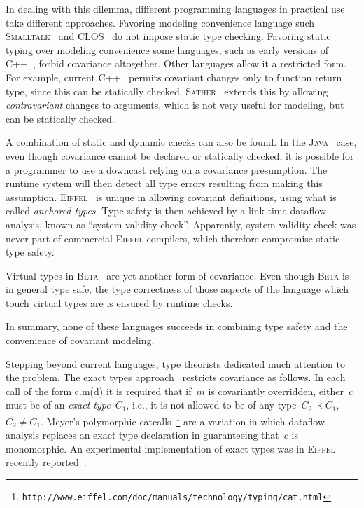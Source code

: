 \documentclass[11pt]{article}
\numberwithin{figure}{section}
\newcommand\CC{\Lang{\mbox{C++}}\xspace}
\newcommand\Lang[1]{\textsc{#1}}
\begin{document}
In dealing with this dilemma, different programming languages in practical
    use take different approaches.
Favoring modeling convenience
    language such \Lang{Smalltalk}~\cite{Goldberg:Robson:Book:83}
    and \Lang{CLOS}~\cite{Steele:90} do not impose static type checking.
Favoring static typing over modeling convenience some languages,
    such as early versions of \CC~\cite{Stroustrup:Book:91},
    forbid covariance altogether.
Other languages allow it a restricted form.
For example, current \CC~\cite{Stroustrup:Book:97} permits
    covariant changes only to function return type, since this can
    be statically checked.
\Lang{Sather}~\cite{Szypersky:Omohundro:Murer:93,Omohundro:94} extends this by allowing
    \emph{contravariant} changes to arguments, which is not
    very useful for modeling, but can be statically checked.


A combination of static and dynamic checks can also be found.
In the \Lang{Java}~\cite{Arnold:Gosling:96} case, even though
    covariance cannot be declared or statically checked,
    it is possible for a programmer to use a downcast
    relying on a covariance presumption.
The runtime system will then detect all type errors
    resulting from making this assumption.
\textsc{Eiffel}~\cite{Meyer:Eiffel:92} is unique in allowing
    covariant definitions, using what is called \emph{anchored types}.
Type safety is then achieved by a link-time dataflow analysis,
    known as ``system validity check''.
Apparently, system validity check was never part
    of commercial \Lang{Eiffel} compilers, which
    therefore compromise static type safety.

Virtual types in
    \Lang{Beta}~\cite{Madsen:Moller-Pedersen:Nygaard:93}
    are yet another form of covariance.
Even though \Lang{Beta} is in general type safe,
    the type correctness of those aspects of the language
    which touch virtual types are is ensured by runtime checks.

In summary, none of these languages succeeds in combining
    type safety and the convenience of covariant modeling.

Stepping beyond current languages, type theorists dedicated
    much attention to the problem.
The exact types approach~\cite{Bruce:97} restricts covariance
    as follows.
In each call of the form
    c.m(d)
\eeq
it is required that if~$m$ is covariantly overridden,
        either~$c$ must be of an \emph{exact type}~$C_1$, i.e., it is not
        allowed to be of any type~$C_2 \prec C_1$,~$C_2 \ne C_1$.
Meyer's polymorphic
    catcalls~\footnote{\texttt{http://www.eiffel.com/doc/manuals/technology/typing/cat.html}}
    are a variation in which dataflow analysis replaces an exact type declaration
    in guaranteeing that~$c$ is monomorphic.
An experimental implementation of exact types was in \Lang{Eiffel}
    recently
    reported~\cite{Colnet:Liquori:00}.
\end{document}
